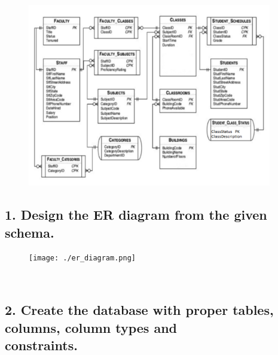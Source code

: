 \documentclass{article}
\begin{document}
\section*{}
\begin{figure}[h!]
    \centering
    \includegraphics[width=0.95\textwidth]{./uml_diagram.png} %
    \label{fig:schema}
\end{figure}
\subsection*{1.  Design the ER diagram from the given schema.}
\begin{figure}[h!]
    \centering
    \texttt{[image: ./er\_diagram.png]} %
    \label{fig:schema}
\end{figure}
\\
\newpage
\subsection*{2. Create the database with proper tables, columns, column types and \\
constraints.}
\end{document}
